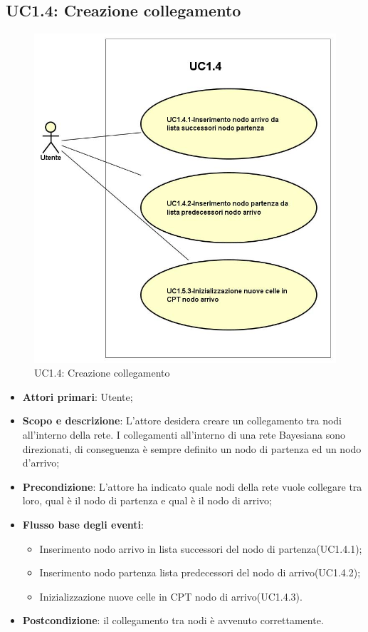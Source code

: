 \subsection{UC1.4: Creazione collegamento} 
\hypertarget{UC1.4}{} 
\begin{figure} [H]
	\centering
	\includegraphics[scale=0.45]{Img/UC1-4} 
	\caption{UC1.4: Creazione collegamento} \label{} 
\end{figure} 
\begin{itemize} 
	\item{\textbf{Attori primari}: Utente;} 
	\item{\textbf{Scopo e descrizione}: L'attore desidera creare un collegamento tra nodi all'interno della rete. I collegamenti all'interno di una rete Bayesiana sono direzionati, di conseguenza è sempre definito un nodo di partenza ed un nodo d'arrivo;} 
	\item{\textbf{Precondizione}: L'attore ha indicato quale nodi della rete vuole collegare tra loro, qual è il nodo di partenza e qual è il nodo di arrivo;} 
	\item{\textbf{Flusso base degli eventi}: } 
	\begin{itemize} 
		\item{Inserimento nodo arrivo in lista successori del nodo di partenza(UC1.4.1);} 
		\item{Inserimento nodo partenza lista predecessori del nodo di arrivo(UC1.4.2);} 
		\item{Inizializzazione nuove celle in CPT nodo di arrivo(UC1.4.3).} 
	\end{itemize} 
	\item{\textbf{Postcondizione}: il collegamento tra nodi è avvenuto correttamente.} 
\end{itemize} 
